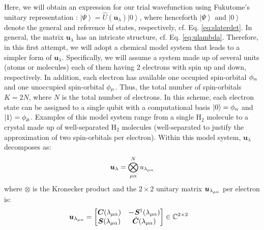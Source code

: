 \documentclass{aux/ttuthes2007}
\newcommand{\ket}[1]{\ensuremath{\left|#1\right\rangle}}
\newcommand{\elec}{N}
\newcommand{\orb}{K}
\newcommand{\uo}[1]{
		\IfEqCase{#1}{
			{0}{\mu}
			{1}{\nu}
			{2}{\xi}
		}[\PackageError{uo}{Undefined option to uo: #1}{}]
}
\newcommand{\oo}[1]{
		\IfEqCase{#1}{
			{0}{\alpha}
			{1}{\beta}
			{2}{\gamma}
		}[\PackageError{unocorb}{Undefined option to unuo: #1}{}]
}
\begin{document}
Here, we will obtain an expression for our trial wavefunction using Fukutome’s unitary representation : 
$\ket \Psi = \hat U (\bm u_\lambda) \ket 0$,
where henceforth $\ket \Psi$ and $\ket 0$ denote the general and reference \gls{hf} states, respectively, cf. Eq. \ref{eq:slaterdet}.
In general, the matrix $\bm u_\lambda$ has an intricate structure, cf. Eq. \ref{eq:ulambda}.
Therefore, in this first attempt, we will adopt a chemical model system that leads to a simpler form of $\bm u_\lambda$.
Specifically, we will assume a system made up of several units (atoms or molecules) each of them having 2 electrons with spin up and down, respectively.
In addition, each electron has available one occupied spin-orbital $\phi_{\oo 0}$ and one unoccupied spin-orbital $\phi_{\uo 0}$.
Thus, the total number of spin-orbitals $\orb = 2\elec$, where $\elec$ is the total number of electrons.
In this scheme, each electron state can be assigned to a single qubit with a computational basis
$\ket 0 = \phi_{\oo 0}$ and $\ket 1 = \phi_{\uo 0}$.
Examples of this model system range from a single $\text{H}_2$ molecule to a crystal made up of well-separated $\text{H}_2$ molecules (well-separated to justify the approximation of two spin-orbitals per electron). 
Within this model system, $\bm u_\lambda$ decomposes as:
\begin{equation}
	\begin{split}
	\label {eq:udecomposition}
	\bm u_\lambda
	= \bigotimes_{\uo 0 \oo 0}^N u_{\lambda_{\uo 0 \oo 0}}
	\end{split}
\end{equation}
%
where $\otimes$ is the Kronecker product and the $2\times2$ unitary matrix $\bm u_{\lambda_{\uo 0 \oo 0}}$ per electron is:
%
\begin{align*}
	\bm u_{\lambda_{\uo 0 \oo 0}} 
	&= \begin{bmatrix}\bm C(\lambda_{\uo 0 \oo 0}) & \bm -\bm S^\dagger(\lambda_{\uo 0 \oo 0}) \\ \bm S(\lambda_{\uo 0 \oo 0}) & \tilde {\bm C}(\lambda_{\uo 0 \oo 0})\end{bmatrix} \in \mathbb{\bm C}^{2\times 2}
\end{align*}
\end{document}
